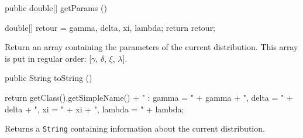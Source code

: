 \begin{code}

   public double[] getParams ()\begin{hide} {
      double[] retour = {gamma, delta, xi, lambda};
      return retour;
   }\end{hide}
\end{code}
\begin{tabb}
   Return an array containing the parameters of the current distribution.
   This array is put in regular order: [$\gamma$, $\delta$, $\xi$, $\lambda$].
\end{tabb}
\begin{hide}\begin{code}

   public String toString ()\begin{hide} {
      return getClass().getSimpleName() + " : gamma = " + gamma + ", delta = " + delta + ", xi = " + xi + ", lambda = " + lambda;
   }\end{hide}
\end{code}
\begin{tabb}
   Returns a \texttt{String} containing information about the current distribution.
\end{tabb}\end{hide}
\begin{code}\begin{hide}
}\end{hide}
\end{code}
